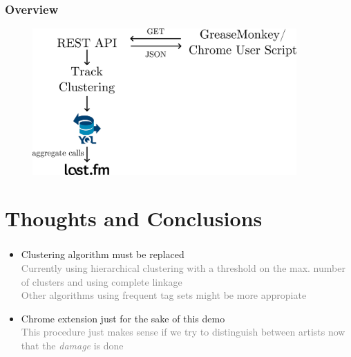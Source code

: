 \documentclass[slidestop,compress,mathserif,serif,notes=show]{beamer}
\begin{document}
  
  \begin{frame}
    \frametitle{Overview}
    \vspace{0.5cm}
    \begin{figure}
      \centering 
      \includegraphics[width=0.9\textwidth]{figs/diagram.pdf} 
      \label{fig:diagram} 
    \end{figure}
  \end{frame}


  \section{Thoughts and Conclusions}
  \begin{frame}
    \frametitle{\secname{}}
    \vspace{1cm}
    \begin{itemize}
      \item{}
      Clustering algorithm must be replaced\\
      \textcolor{gray}{Currently using hierarchical clustering with a threshold on the
      max. number of clusters and using complete linkage\\
      Other algorithms using frequent tag sets might be more appropiate}
      \item{}
      Chrome extension just for the sake of this demo\\
      \textcolor{gray}{This procedure just makes sense if we try
      to distinguish between artists now that the \textit{damage} is done}
    \end{itemize}
  \end{frame}
\end{document}
